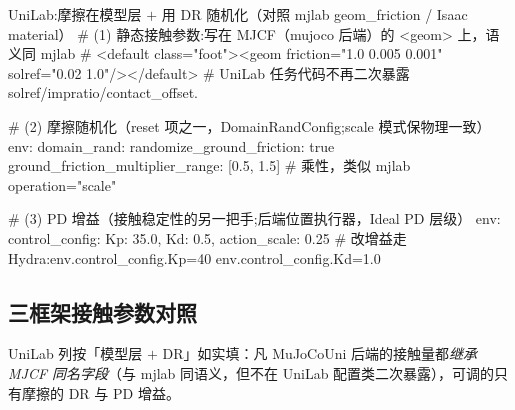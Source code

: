 \begin{codebox}[Python]{UniLab:摩擦在模型层 $+$ 用 DR 随机化（对照 mjlab geom\_friction / Isaac material）}
# (1) 静态接触参数:写在 MJCF（mujoco 后端）的 <geom> 上，语义同 mjlab
#     <default class="foot"><geom friction="1.0 0.005 0.001" solref="0.02 1.0"/></default>
#     UniLab 任务代码不再二次暴露 solref/impratio/contact_offset.

# (2) 摩擦随机化（reset 项之一，DomainRandConfig;scale 模式保物理一致）
env:
  domain_rand:
    randomize_ground_friction: true
    ground_friction_multiplier_range: [0.5, 1.5]   # 乘性，类似 mjlab operation="scale"

# (3) PD 增益（接触稳定性的另一把手;后端位置执行器，Ideal PD 层级）
env:
  control_config: {Kp: 35.0, Kd: 0.5, action_scale: 0.25}
# 改增益走 Hydra:env.control_config.Kp=40 env.control_config.Kd=1.0
\end{codebox}


\subsection{三框架接触参数对照}

UniLab 列按「模型层 $+$ DR」如实填：凡 MuJoCoUni 后端的接触量都\emph{继承 MJCF 同名字段}（与 mjlab 同语义，但不在 UniLab 配置类二次暴露），可调的只有摩擦的 DR 与 PD 增益。

